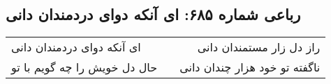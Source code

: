 \begin{center}
\section*{رباعی شماره ۶۸۵: ای آنکه دوای دردمندان دانی}
\label{sec:sh685}
\begin{longtable}{l p{0.5cm} r}
ای آنکه دوای دردمندان دانی
&&
راز دل زار مستمندان دانی
\\
حال دل خویش را چه گویم با تو
&&
ناگفته تو خود هزار چندان دانی
\\
\end{longtable}
\end{center}
